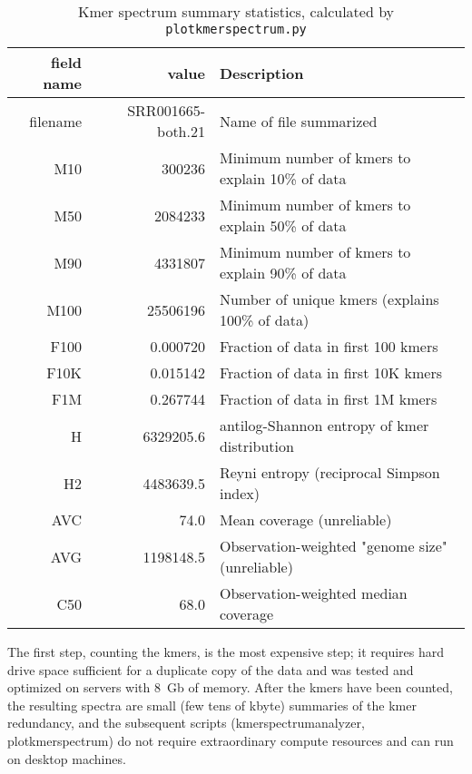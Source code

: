 \documentclass[11pt,fullpage]{article}
\begin{document}
\begin{table}
\begin{tabular}{rrl}
field name & value & Description \\
\hline
filename	 & SRR001665-both.21 & Name of file summarized \\
M10  & 300236	 & Minimum number of kmers to explain 10\% of data\\
M50  & 2084233	 & Minimum number of kmers to explain 50\% of data \\
M90  & 4331807	 & Minimum number of kmers to explain 90\% of data \\
M100 & 25506196	 & Number of unique kmers  (explains 100\% of data)\\
F100 & 0.000720	 & Fraction of data in first 100 kmers\\
F10K & 0.015142	 & Fraction of data in first 10K kmers \\
F1M &  0.267744 &  Fraction of data in first 1M kmers  \\
H & 6329205.6	 &  antilog-Shannon entropy of kmer distribution \\
H2 & 4483639.5	 &  Reyni entropy (reciprocal Simpson index)  \\
AVC & 74.0	 &  Mean coverage  (unreliable) \\
AVG & 1198148.5	 &   Observation-weighted "genome size" (unreliable)\\
C50 & 68.0       &   Observation-weighted median coverage  \\
\hline
\end{tabular}
\caption{Kmer spectrum summary statistics, calculated by \texttt{plotkmerspectrum.py} }
\label{statisticstable}
\end{table}

The first step, counting the kmers, is the most expensive step; it requires
hard drive space sufficient for a duplicate copy of the data and was tested
and optimized on servers with 8~Gb of memory.  After the kmers have been
counted, the resulting spectra are small (few tens of kbyte) summaries of
the kmer redundancy, and the subsequent scripts (kmerspectrumanalyzer,
plotkmerspectrum) do not require extraordinary compute resources and
can run on desktop machines.
\end{document}
